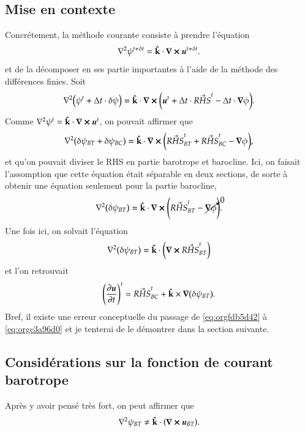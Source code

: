 \documentclass[10pt]{article}
\numberwithin{equation}{section}
\newcommand{\kvf}{\vb{\hat{k}}}
\newcommand{\uu}{\vb*{u}}
\begin{document}
\subsection{Mise en contexte}
\label{sec:org58f2fbe}
Concrétement, la méthode courante consiste à prendre l'équation
\begin{equation}
   \laplacian{\psi^{t+\delta t}} = \kvf\cdot\curl{\uu^{t+\delta t}}.
\end{equation}
et de la décomposer en ses partie importantes à l'aide de la méthode des différences finies.
Soit
\begin{equation}
   \laplacian(\psi^t + \Delta t\cdot\delta \psi) = \kvf\cdot\curl(\uu^t + \Delta t\cdot\vec{RHS}^t - \Delta t\cdot\gradient{\phi}).
\end{equation}
Comme \(\laplacian{\psi^t} = \kvf\cdot\curl{\uu^t}\), on pouvait affirmer que
\begin{equation}
\label{eq:orgfdb5d42}
   \laplacian(\delta \psi_{BT} + \delta \psi_{BC}) = \kvf\cdot\curl(\vec{RHS}^t_{BT} + \vec{RHS}^t_{BC} - \gradient{\phi}),
\end{equation}
et qu'on pouvait diviser le RHS en partie barotrope et barocline.
Ici, on faisait l'assomption que cette équation était séparable en deux sections, de sorte à obtenir une équation seulement pour la partie barocline,
\begin{equation}
\label{eq:orgc3a96d0}
   \laplacian(\delta \psi_{BT}) = \kvf\cdot\curl(\vec{RHS}^t_{BT} - \cancelto{0}{\gradient{\phi}}).
\end{equation}
Une fois ici, on solvait l'équation
\begin{equation}
   \laplacian(\delta \psi_{BT}) = \kvf\cdot\qty(\curl{\vec{RHS}^t_{BT}})
\end{equation}
et l'on retrouvait
\begin{equation}
   \qty(\pdv{\uu}{t})^t = \vec{RHS}^t_{BC} + \kvf\times\gradient(\delta\psi_{BT}).
\end{equation}
Bref, il existe une erreur conceptuelle du passage de \ref{eq:orgfdb5d42} à \ref{eq:orgc3a96d0} et je tenterai de le démontrer dans la section suivante.


\subsection{Considérations sur la fonction de courant barotrope}
\label{sec:org36ada7b}
Après y avoir pensé très fort, on peut affirmer que
\begin{equation}
   \laplacian{\psi_{BT}} \not= \kvf\cdot\qty(\curl{\uu_{BT}}).
\end{equation}
\end{document}
